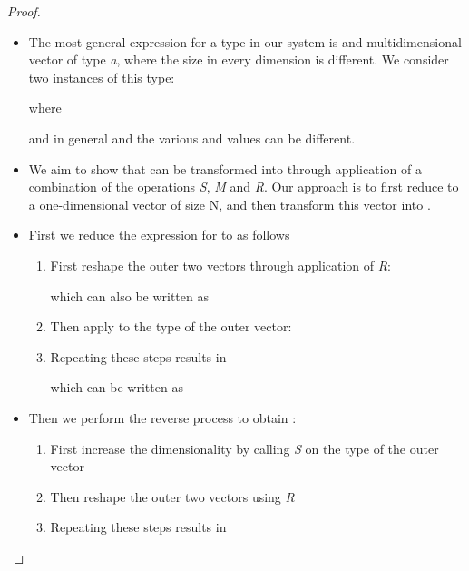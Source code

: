 \documentclass{article}
\begin{document}
\begin{proof}

~
\begin{itemize}
\item The most general expression for a type in our system is and multidimensional
vector of type \emph{a}, where the size in every dimension is different.
We consider two instances of this type:






where 



 


and in general  and the various  and  values
can be different.

\item We aim to show that  can be transformed into  through
application of a combination of the operations \emph{S}, \emph{M}
and \emph{R}. Our approach is to first reduce  to a one-dimensional
vector of size N, and then transform this vector into .
\item First we reduce the expression for  to as
follows

\begin{enumerate}
\item First reshape the outer two vectors through application of \emph{R}:



 


which can also be written as



 

\item Then apply  to the type of the outer vector:



 

\item Repeating these steps results in






which can be written as





\end{enumerate}
\item Then we perform the reverse process to obtain :

\begin{enumerate}
\item First increase the dimensionality by calling \emph{S} on the type
of the outer vector





\item Then reshape the outer two vectors using \emph{R}





\item Repeating these steps results in
\end{enumerate}




\end{itemize}
\end{proof}
\end{document}

